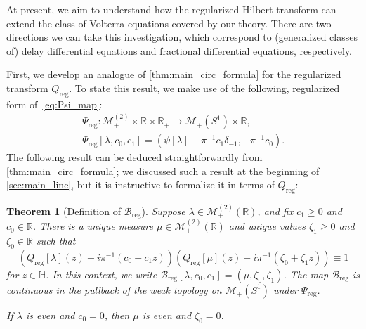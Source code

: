 \documentclass{cams-l} %
\newcommand{\RR}{\mathbb R}
\newcommand{\HH}{\mathbb H}
\newcommand{\cM}{\mathcal M}
\newcommand{\cB}{\mathcal B}
\newtheorem{theorem}{Theorem}[section]
\theoremstyle{definition}
\theoremstyle{remark}
\numberwithin{equation}{section}
\begin{document}
    At present, we aim to understand how the regularized Hilbert transform can extend the class of Volterra equations covered by our theory. There are two directions we can take this investigation, which correspond to (generalized classes of) delay differential equations and fractional differential equations, respectively. 

First, we develop an analogue of \cref{thm:main_circ_formula} for the regularized transform $Q_\mathrm{reg}$. To state this result, we make use of the following, regularized form of~\cref{eq:Psi_map}:
\begin{equation}\label{eq:embedding_reg}
\begin{gathered}
\Psi_\mathrm{reg}:\cM_+^{(2)}\times\RR\times\RR_+\to \cM_+(S^1)\times\RR,\\
    \Psi_\mathrm{reg}[\lambda,c_0,c_1] = (\psi[\lambda] + \pi^{-1}c_1\delta_{-1}, -\pi^{-1}c_0).
    \end{gathered}
\end{equation}
The following result can be deduced straightforwardly from \cref{thm:main_circ_formula}; we discussed such a result at the beginning of \cref{sec:main_line}, but it is instructive to formalize it in terms of $Q_\mathrm{reg}$:
\begin{theorem}[Definition of $\cB_\mathrm{reg}$]\label{thm:main_rPD}
    Suppose $\lambda\in\cM_+^{(2)}(\RR)$, and fix $c_1\geq 0$ and $c_0\in\RR$. There is a unique measure $\mu\in\cM_+^{(2)}(\RR)$ and unique values $\zeta_1\geq 0$ and $\zeta_0\in\RR$ such that
    \[(Q_\mathrm{reg}[\lambda](z) - i\pi^{-1}(c_0+c_1z))(Q_\mathrm{reg}[\mu](z) - i\pi^{-1}(\zeta_0+\zeta_1z))\equiv 1\]
    for $z\in\HH$. In this context, we write $\cB_\mathrm{reg}[\lambda,c_0,c_1] = (\mu,\zeta_0,\zeta_1)$. The map $\cB_\mathrm{reg}$ is continuous in the pullback of the weak topology on $\cM_+(S^1)$ under $\Psi_\mathrm{reg}$.

    If $\lambda$ is even and $c_0=0$, then $\mu$ is even and $\zeta_0=0$.
\end{theorem}
\end{document}
